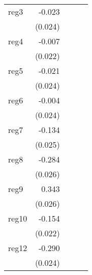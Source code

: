 {\begin{longtable}{l*{4}{D{.}{.}{-1}}}
\addlinespace
reg3        &      -0.023         &                     &                     &                     \\
            &     (0.024)         &                     &                     &                     \\
\addlinespace
reg4        &      -0.007         &                     &                     &                     \\
            &     (0.022)         &                     &                     &                     \\
\addlinespace
reg5        &      -0.021         &                     &                     &                     \\
            &     (0.024)         &                     &                     &                     \\
\addlinespace
reg6        &      -0.004         &                     &                     &                     \\
            &     (0.024)         &                     &                     &                     \\
\addlinespace
reg7        &      -0.134\sym{***}&                     &                     &                     \\
            &     (0.025)         &                     &                     &                     \\
\addlinespace
reg8        &      -0.284\sym{***}&                     &                     &                     \\
            &     (0.026)         &                     &                     &                     \\
\addlinespace
reg9        &       0.343\sym{***}&                     &                     &                     \\
            &     (0.026)         &                     &                     &                     \\
\addlinespace
reg10       &      -0.154\sym{***}&                     &                     &                     \\
            &     (0.022)         &                     &                     &                     \\
\addlinespace
reg12       &      -0.290\sym{***}&                     &                     &                     \\
            &     (0.024)         &                     &                     &                     \\

\end{longtable}}
